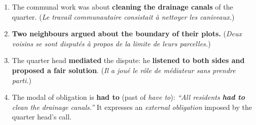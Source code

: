 \documentclass[11pt]{article}
\begin{document}
\begin{corrige}

\begin{enumerate}
\item The communal work was about \textbf{cleaning the drainage canals} of the quarter. (\emph{Le travail communautaire consistait à nettoyer les caniveaux.})

\item \textbf{Two neighbours argued about the boundary of their plots.} (\emph{Deux voisins se sont disputés à propos de la limite de leurs parcelles.})

\item The quarter head \textbf{mediated} the dispute: he \textbf{listened to both sides and proposed a fair solution}. (\emph{Il a joué le rôle de médiateur sans prendre parti.})

\item The modal of obligation is \textbf{had to} (past of \emph{have to}): \emph{``All residents \textbf{had to} clean the drainage canals.''} It expresses an \emph{external obligation} imposed by the quarter head's call.
\end{enumerate}
\end{corrige}
\end{document}
